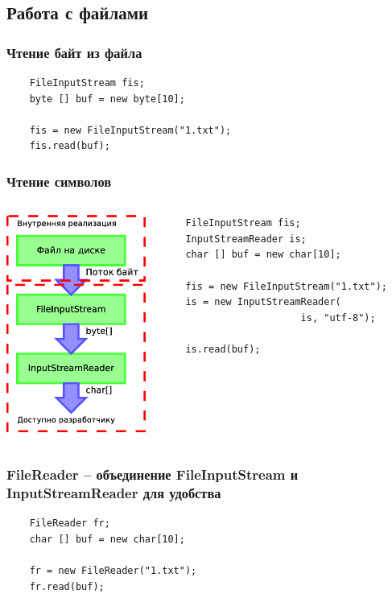 \subsection{Работа с файлами}
\begin{frame}[fragile]
	\frametitle{Чтение байт из файла}

	\begin{Large}
	\begin{verbatim}
	FileInputStream fis;
	byte [] buf = new byte[10];

	fis = new FileInputStream("1.txt");
	fis.read(buf);
	\end{verbatim}
	\end{Large}
\end{frame}

\begin{frame}[fragile]
	\frametitle{Чтение символов}

	\begin{columns}[c]
	\column{1.7in}
	\includegraphics[width=1.8in]{lesson-3-Diagram1.eps}
	\column{2.8in}
	\begin{verbatim}
	FileInputStream fis;
	InputStreamReader is;
	char [] buf = new char[10];

	fis = new FileInputStream("1.txt");
	is = new InputStreamReader(
	                    is, "utf-8");

	is.read(buf);
	\end{verbatim}
	\end{columns}
\end{frame}

\begin{frame}[fragile]
	\frametitle{FileReader -- объединение FileInputStream и InputStreamReader для удобства}

	\begin{Large}
	
	\begin{verbatim}
	FileReader fr;
	char [] buf = new char[10];

	fr = new FileReader("1.txt");
	fr.read(buf);
	\end{verbatim}
	\end{Large}
\end{frame}

